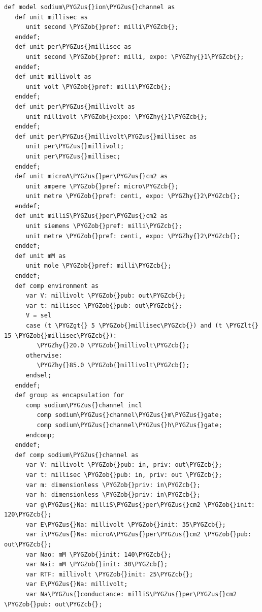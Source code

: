 \documentclass[a4paper,10pt,english]{sphinxmanual}
\def\PYGZus{\char`\_}
\def\PYGZob{\char`\{}
\def\PYGZcb{\char`\}}
\def\PYGZlt{\char`\<}
\def\PYGZgt{\char`\>}
\def\PYGZhy{\char`\-}
\begin{document}
\begin{Verbatim}[commandchars=\\\{\}]
def model sodium\PYGZus{}ion\PYGZus{}channel as
   def unit millisec as
      unit second \PYGZob{}pref: milli\PYGZcb{};
   enddef;
   def unit per\PYGZus{}millisec as
      unit second \PYGZob{}pref: milli, expo: \PYGZhy{}1\PYGZcb{};
   enddef;
   def unit millivolt as
      unit volt \PYGZob{}pref: milli\PYGZcb{};
   enddef;
   def unit per\PYGZus{}millivolt as
      unit millivolt \PYGZob{}expo: \PYGZhy{}1\PYGZcb{};
   enddef;
   def unit per\PYGZus{}millivolt\PYGZus{}millisec as
      unit per\PYGZus{}millivolt;
      unit per\PYGZus{}millisec;
   enddef;
   def unit microA\PYGZus{}per\PYGZus{}cm2 as
      unit ampere \PYGZob{}pref: micro\PYGZcb{};
      unit metre \PYGZob{}pref: centi, expo: \PYGZhy{}2\PYGZcb{};
   enddef;
   def unit milliS\PYGZus{}per\PYGZus{}cm2 as
      unit siemens \PYGZob{}pref: milli\PYGZcb{};
      unit metre \PYGZob{}pref: centi, expo: \PYGZhy{}2\PYGZcb{};
   enddef;
   def unit mM as
      unit mole \PYGZob{}pref: milli\PYGZcb{};
   enddef;
   def comp environment as
      var V: millivolt \PYGZob{}pub: out\PYGZcb{};
      var t: millisec \PYGZob{}pub: out\PYGZcb{};
      V = sel
      case (t \PYGZgt{} 5 \PYGZob{}millisec\PYGZcb{}) and (t \PYGZlt{} 15 \PYGZob{}millisec\PYGZcb{}):
         \PYGZhy{}20.0 \PYGZob{}millivolt\PYGZcb{};
      otherwise:
         \PYGZhy{}85.0 \PYGZob{}millivolt\PYGZcb{};
      endsel;
   enddef;
   def group as encapsulation for
      comp sodium\PYGZus{}channel incl
         comp sodium\PYGZus{}channel\PYGZus{}m\PYGZus{}gate;
         comp sodium\PYGZus{}channel\PYGZus{}h\PYGZus{}gate;
      endcomp;
   enddef;
   def comp sodium\PYGZus{}channel as
      var V: millivolt \PYGZob{}pub: in, priv: out\PYGZcb{};
      var t: millisec \PYGZob{}pub: in, priv: out \PYGZcb{};
      var m: dimensionless \PYGZob{}priv: in\PYGZcb{};
      var h: dimensionless \PYGZob{}priv: in\PYGZcb{};
      var g\PYGZus{}Na: milliS\PYGZus{}per\PYGZus{}cm2 \PYGZob{}init: 120\PYGZcb{};
      var E\PYGZus{}Na: millivolt \PYGZob{}init: 35\PYGZcb{};
      var i\PYGZus{}Na: microA\PYGZus{}per\PYGZus{}cm2 \PYGZob{}pub: out\PYGZcb{};
      var Nao: mM \PYGZob{}init: 140\PYGZcb{};
      var Nai: mM \PYGZob{}init: 30\PYGZcb{};
      var RTF: millivolt \PYGZob{}init: 25\PYGZcb{};
      var E\PYGZus{}Na: millivolt;
      var Na\PYGZus{}conductance: milliS\PYGZus{}per\PYGZus{}cm2 \PYGZob{}pub: out\PYGZcb{};


\end{Verbatim}
\end{document}
